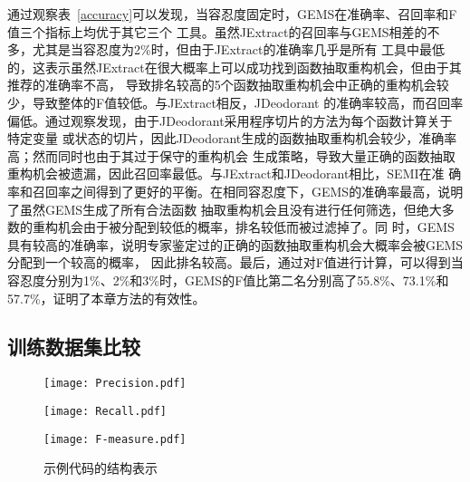 通过观察表~\ref{accuracy}可以发现，当容忍度固定时，GEMS在准确率、召回率和F值三个指标上均优于其它三个
工具。虽然JExtract的召回率与GEMS相差的不多，尤其是当容忍度为2\%时，但由于JExtract的准确率几乎是所有
工具中最低的，这表示虽然JExtract在很大概率上可以成功找到函数抽取重构机会，但由于其推荐的准确率不高，
导致排名较高的5个函数抽取重构机会中正确的重构机会较少，导致整体的F值较低。与JExtract相反，JDeodorant
的准确率较高，而召回率偏低。通过观察发现，由于JDeodorant采用程序切片的方法为每个函数计算关于特定变量
或状态的切片，因此JDeodorant生成的函数抽取重构机会较少，准确率高；然而同时也由于其过于保守的重构机会
生成策略，导致大量正确的函数抽取重构机会被遗漏，因此召回率最低。与JExtract和JDeodorant相比，SEMI在准
确率和召回率之间得到了更好的平衡。在相同容忍度下，GEMS的准确率最高，说明了虽然GEMS生成了所有合法函数
抽取重构机会且没有进行任何筛选，但绝大多数的重构机会由于被分配到较低的概率，排名较低而被过滤掉了。同
时，GEMS具有较高的准确率，说明专家鉴定过的正确的函数抽取重构机会大概率会被GEMS分配到一个较高的概率，
因此排名较高。最后，通过对F值进行计算，可以得到当容忍度分别为1\%、2\%和3\%时，GEMS的F值比第二名分别高了55.8\%、73.1\%和57.7\%，证明了本章方法的有效性。

\subsection{训练数据集比较}\label{RQ2}

\begin{figure} 
  \centering 
  \begin{minipage}[c]{0.33\textwidth} 
    \centering 
    \texttt{[image: Precision.pdf]} 
  \end{minipage}%
  \begin{minipage}[c]{0.33\textwidth} 
    \centering 
    \texttt{[image: Recall.pdf]} 
  \end{minipage} 
  \begin{minipage}[c]{0.33\textwidth} 
    \centering 
    \texttt{[image: F-measure.pdf]} 
  \end{minipage} 
\caption{示例代码的结构表示}
\label{block-example}
\end{figure}

\iffalse
\begin{figure}[!t]
\centering
\subfloat[Precision]{\texttt{[image: Precision.pdf]}%
\label{fig_first_case}}
\hfil
\subfloat[Recall]{\texttt{[image: Recall.pdf]}%
\label{fig_second_case}}
\hfil
\subfloat[F-measure]{\texttt{[image: F-measure.pdf]}%
\label{fig_third_case}}
\caption{Accuracy with Different Datasets}
\label{diff_data}
\end{figure}
\fi
